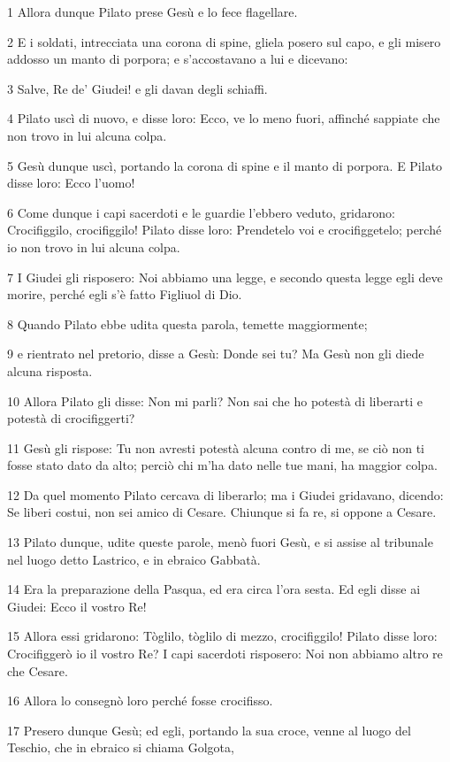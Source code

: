 \par 1 Allora dunque Pilato prese Gesù e lo fece flagellare.
\par 2 E i soldati, intrecciata una corona di spine, gliela posero sul capo, e gli misero addosso un manto di porpora; e s'accostavano a lui e dicevano:
\par 3 Salve, Re de' Giudei! e gli davan degli schiaffi.
\par 4 Pilato uscì di nuovo, e disse loro: Ecco, ve lo meno fuori, affinché sappiate che non trovo in lui alcuna colpa.
\par 5 Gesù dunque uscì, portando la corona di spine e il manto di porpora. E Pilato disse loro: Ecco l'uomo!
\par 6 Come dunque i capi sacerdoti e le guardie l'ebbero veduto, gridarono: Crocifiggilo, crocifiggilo! Pilato disse loro: Prendetelo voi e crocifiggetelo; perché io non trovo in lui alcuna colpa.
\par 7 I Giudei gli risposero: Noi abbiamo una legge, e secondo questa legge egli deve morire, perché egli s'è fatto Figliuol di Dio.
\par 8 Quando Pilato ebbe udita questa parola, temette maggiormente;
\par 9 e rientrato nel pretorio, disse a Gesù: Donde sei tu? Ma Gesù non gli diede alcuna risposta.
\par 10 Allora Pilato gli disse: Non mi parli? Non sai che ho potestà di liberarti e potestà di crocifiggerti?
\par 11 Gesù gli rispose: Tu non avresti potestà alcuna contro di me, se ciò non ti fosse stato dato da alto; perciò chi m'ha dato nelle tue mani, ha maggior colpa.
\par 12 Da quel momento Pilato cercava di liberarlo; ma i Giudei gridavano, dicendo: Se liberi costui, non sei amico di Cesare. Chiunque si fa re, si oppone a Cesare.
\par 13 Pilato dunque, udite queste parole, menò fuori Gesù, e si assise al tribunale nel luogo detto Lastrico, e in ebraico Gabbatà.
\par 14 Era la preparazione della Pasqua, ed era circa l'ora sesta. Ed egli disse ai Giudei: Ecco il vostro Re!
\par 15 Allora essi gridarono: Tòglilo, tòglilo di mezzo, crocifiggilo! Pilato disse loro: Crocifiggerò io il vostro Re? I capi sacerdoti risposero: Noi non abbiamo altro re che Cesare.
\par 16 Allora lo consegnò loro perché fosse crocifisso.
\par 17 Presero dunque Gesù; ed egli, portando la sua croce, venne al luogo del Teschio, che in ebraico si chiama Golgota,
